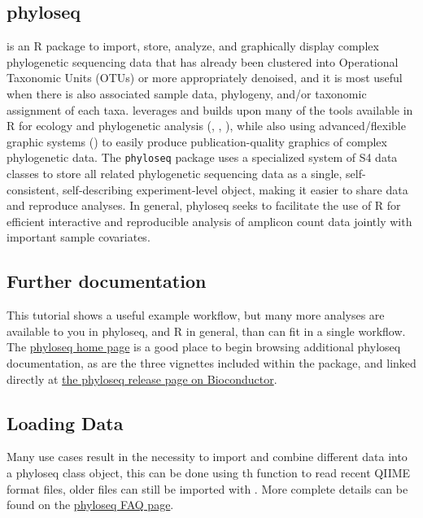 
\subsection*{phyloseq}

\cite{phyloseqplosone}
is an R package to import, store, analyze, and graphically display complex
phylogenetic sequencing data that has already been
clustered into Operational Taxonomic Units (OTUs)
or more appropriately denoised,
and it is most useful when there is also associated
sample data,
phylogeny,
and/or taxonomic assignment of each taxa.
 leverages and builds upon
many of the tools available in R
for ecology and phylogenetic analysis (, , ),
while also using advanced/flexible graphic systems ()
to easily produce publication-quality graphics of complex phylogenetic data.
The {\tt phyloseq} package uses a specialized system of S4 data classes
to store all related phylogenetic sequencing data
as a single, self-consistent, self-describing experiment-level object,
making it easier to share data and reproduce analyses.
In general, phyloseq seeks to facilitate the use of R
for efficient interactive and reproducible analysis
of amplicon count data jointly with important sample covariates.

\subsection*{Further documentation}

This tutorial shows a useful example workflow,
but many more analyses are available to you in phyloseq, and R in general,
than can fit in a single workflow.
The \href{http://joey711.github.io/phyloseq/}{phyloseq home page}
is a good place to begin browsing additional phyloseq documentation,
as are the three vignettes included within the package,
and linked directly at
\href{http://bioconductor.org/packages/release/bioc/html/phyloseq.html}{the phyloseq release page on Bioconductor}.








\subsection*{Loading Data}
Many use cases result in the necessity to import and combine different
data into a phyloseq class object,
this can be done using th 
function to read recent QIIME format files, older files
can still be imported with .
More complete details can be found on the
\href{https://www.bioconductor.org/packages/release/bioc/vignettes/phyloseq/inst/doc/phyloseq-FAQ.html}{phyloseq FAQ page}.

